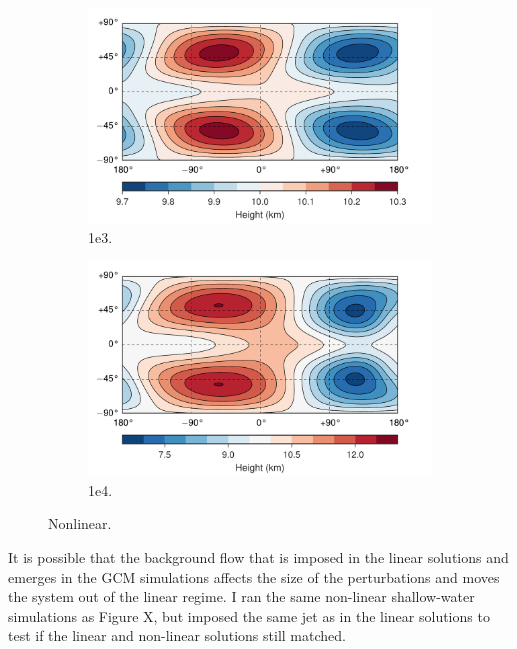 \begin{figure}
  \begin{subfigure}[b]{0.5\textwidth}
    \includegraphics[width=1.0\textwidth]{figures/nonlinear-circulation/nonlin-matsuno-1e3.pdf}
    \caption{1e3.}
    \label{fig:nonlinear-matsuno-1e3}
  \end{subfigure}
  \begin{subfigure}[b]{0.5\textwidth}
    \includegraphics[width=1.0\textwidth]{figures/nonlinear-circulation/nonlin-matsuno-1e4.pdf}
    \caption{1e4.}
    \label{fig:nonlinear-matsuno-1e4}
  \end{subfigure}
  \caption{Nonlinear.}
  \label{fig:nonlinear-matsuno}
\end{figure}

It is possible that the background flow that is imposed in the linear solutions and emerges in the GCM simulations affects the size of the perturbations and moves the system out of the linear regime. I ran the same non-linear shallow-water simulations as Figure X, but imposed the same jet as in the linear solutions to test if the linear and non-linear solutions still matched.

